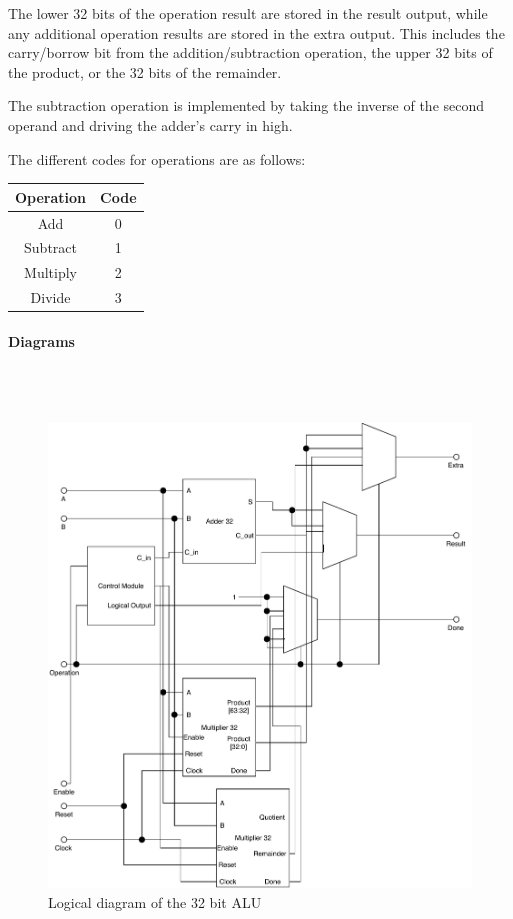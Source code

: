 \documentclass{article}
\begin{document}
    The lower 32 bits of the operation result are stored in the result output,
    while any additional operation results are stored in the extra output.
    This includes the carry/borrow bit from the addition/subtraction
    operation, the upper 32 bits of the product, or the 32 bits of the
    remainder.

    The subtraction operation is implemented by taking the inverse of the
    second operand and driving the adder's carry in high.

    The different codes for operations are as follows:

    \begin{center}
        \begin{tabular}{|c|c|}
            \hline
            Operation & Code
            \\\hline\hline
            Add & 0
            \\\hline
            Subtract & 1
            \\\hline
            Multiply & 2
            \\\hline
            Divide & 3
            \\\hline
        \end{tabular}
    \end{center}

    \paragraph{Diagrams}
    \hfill\\\\
    \begin{figure}[H]
        \centering
        \includegraphics[width=\textwidth]{../diagrams/alu/alu_32.pdf}
        \caption{Logical diagram of the 32 bit ALU}
    \end{figure}
\end{document}

